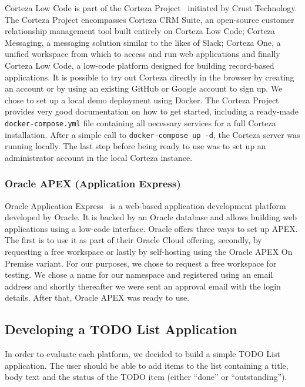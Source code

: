 \documentclass[runningheads]{llncs}
\begin{document}
Corteza Low Code is part of the Corteza Project~\cite{corteza} initiated by Crust Technology. The Corteza Project encompasses Corteza CRM Suite, an open-source customer relationship management tool built entirely on Corteza Low Code; Corteza Messaging, a messaging solution similar to the likes of Slack; Corteza One, a unified workspace from which to access and run web applications and finally Corteza Low Code, a low-code platform designed for building record-based applications. It is possible to try out Corteza directly in the browser by creating an account or by using an existing GitHub or Google account to sign up. We chose to set up a local demo deployment using Docker. The Corteza Project provides very good documentation on how to get started, including a ready-made \texttt{docker-compose.yml} file containing all necessary services for a full Corteza installation. After a simple call to \texttt{docker-compose up -d}, the Corteza server was running locally. The last step before being ready to use was to set up an administrator account in the local Corteza instance.

\subsubsection{Oracle APEX (Application Express)}

Oracle Application Express~\cite{oracle_apex} is a web-based application development platform developed by Oracle. It is backed by an Oracle database and allows building web applications using a low-code interface. Oracle offers three ways to set up APEX. The first is to use it as part of their Oracle Cloud offering, secondly, by requesting a free workspace or lastly by self-hosting using the Oracle APEX On Premise variant. For our purposes, we chose to request a free workspace for testing. We chose a name for our namespace and registered using an email address and shortly thereafter we were sent an approval email with the login details. After that, Oracle APEX was ready to use.

\subsection{Developing a TODO List Application}

In order to evaluate each platform, we decided to build a simple TODO List application. The user should be able to add items to the list containing a title, body text and the status of the TODO item (either “done” or “outstanding”).
\end{document}
